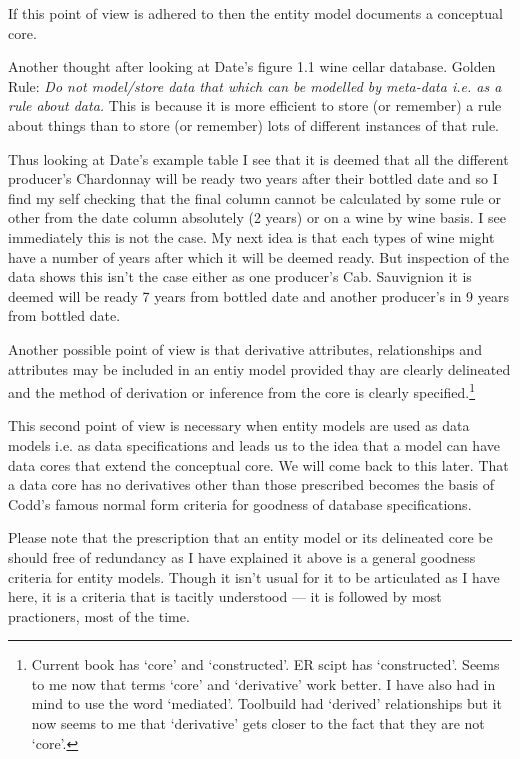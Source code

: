 If this point of view is adhered to then the entity model documents a conceptual core.

\mynote
Another thought after looking at Date's figure 1.1 wine cellar database.
Golden Rule: \textit{Do not model/store data that which can be modelled by meta-data i.e. as a rule about data.}
This is because it is more efficient to store (or remember)  a rule about
things than to store (or remember) lots of different instances of that rule.

Thus looking at Date's example table I see that it is deemed 
that all the different producer's Chardonnay  will be ready  two years after their bottled date and so I find my self checking
that the final column cannot be calculated by some rule or other from the date column absolutely (2 years) or on a wine by wine basis. I see immediately this is not the case. My next idea is that
each types of wine might have a number of years after which it will be deemed ready. But inspection of the data shows this isn't the case either   as one producer's Cab. Sauvignion it is deemed will be
ready  7 years from bottled date and another producer's  in 9 years from bottled date.  

\mynote
Another possible point of view is that derivative attributes, relationships and attributes may be included in an entiy model provided thay are clearly delineated and the method of derivation or inference from the core
is clearly specified.\footnote{Current book has `core' and `constructed'. ER scipt has `constructed'. Seems to me now that terms `core' and `derivative' work better.
I have also had in mind to use the word `mediated'. Toolbuild had `derived' relationships but it now seems to me that `derivative' gets closer to the fact that they are not `core'. }

This second point of view is necessary when entity models are used as data models i.e. as data specifications and leads us to the idea that a model can have data cores that extend the conceptual core. We will come back to this later. That a data core has no derivatives other than those prescribed becomes the basis of Codd's famous normal form criteria for goodness of database specifications. 

\mynote Please note that the prescription that an entity model or its delineated core be should free of redundancy as I have explained it above is a general goodness criteria for entity models. Though it isn't usual for it to be articulated as I have here, it is a  criteria that is tacitly understood --- it is followed by most practioners, most of the time. 

